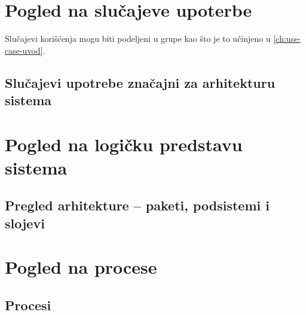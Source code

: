 \chapter{Pogled na slučajeve upoterbe}
Slučajevi korišćenja mogu biti podeljeni u grupe kao što je to učinjeno u \ref{ch:use-case-uvod}.

\section{Slučajevi upotrebe značajni za arhitekturu sistema}

\chapter{Pogled na logičku predstavu sistema}

\section{Pregled arhitekture -- paketi, podsistemi i slojevi}

\chapter{Pogled na procese}

\section{Procesi}
